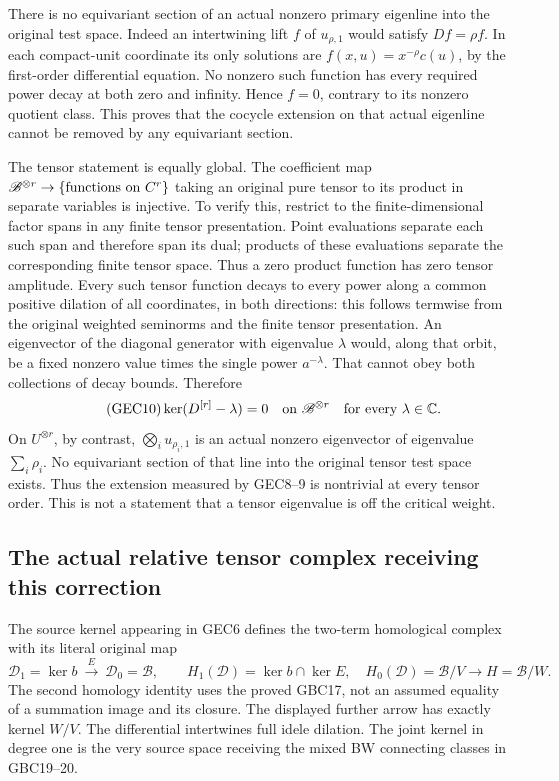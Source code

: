 There is no equivariant section of an actual nonzero primary
eigenline into the original test space. Indeed an intertwining
lift $f$ of $u_{\rho,1}$ would satisfy $Df=\rho f$.
In each compact-unit coordinate its only solutions are
$f(x,u)=x^{-\rho}c(u)$, by the first-order differential equation.
No nonzero such function has every required power decay at
both zero and infinity. Hence $f=0$, contrary to its nonzero
quotient class. This proves that the cocycle extension on that
actual eigenline cannot be removed by any equivariant section.

The tensor statement is equally global. The coefficient map
$\mathscr B^{\otimes r}\to\{\hbox{functions on }C^r\}$ taking
an original pure tensor to its product in separate variables
is injective. To verify this, restrict to the finite-dimensional
factor spans in any finite tensor presentation. Point evaluations
separate each such span and therefore span its dual; products
of these evaluations separate the corresponding finite tensor
space. Thus a zero product function has zero tensor amplitude.
Every such tensor function decays to every power along a common
positive dilation of all coordinates, in both directions: this
follows termwise from the original weighted seminorms and the
finite tensor presentation. An eigenvector of the diagonal
generator with eigenvalue $\lambda$ would, along that orbit,
be a fixed nonzero value times the single power $a^{-\lambda}$.
That cannot obey both collections of decay bounds. Therefore
\begin{equation}\tag{GEC10}
 \ker(D^{[r]}-\lambda)=0\quad\hbox{on }\mathscr B^{\otimes r}
                      \quad\hbox{for every }\lambda\in\mathbb C.
\end{equation}
On $U^{\otimes r}$, by contrast,
$\bigotimes_i u_{\rho_i,1}$ is an actual nonzero eigenvector
of eigenvalue $\sum_i\rho_i$. No equivariant section of that
line into the original tensor test space exists. Thus the
extension measured by GEC8--9 is nontrivial at every tensor
order. This is not a statement that a tensor eigenvalue is
off the critical weight.

\subsection{The actual relative tensor complex receiving this correction}

The source kernel appearing in GEC6 defines the two-term
homological complex with its literal original map
\begin{equation}\tag{GEC11}
 \mathscr D_1=\ker b\ \xrightarrow{\ E\ }\
 \mathscr D_0=\mathscr B,\qquad
 H_1(\mathscr D)=\ker b\cap\ker E,\quad
 H_0(\mathscr D)=\mathscr B/V\longrightarrow H=\mathscr B/W.
\end{equation}
The second homology identity uses the proved GBC17, not an
assumed equality of a summation image and its closure. The
displayed further arrow has exactly kernel $W/V$.
The differential intertwines full idele dilation.
The joint kernel in degree one is the very source space
receiving the mixed BW connecting classes in GBC19--20.

